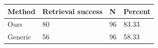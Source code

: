 \begin{tabular}{llll}
\hline
Method & Retrieval success & N & Percent \\
\hline
Ours & 80 & 96 & 83.33 \\
Generic & 56 & 96 & 58.33 \\
\hline
\end{tabular}
